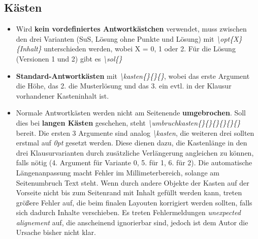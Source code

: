 \documentclass[./main.tex]{subfiles}
\begin{document}
\subsection{Kästen}
\begin{itemize}
    \item Wird \textbf{kein vordefiniertes Antwortk\"astchen} verwendet, muss zwischen den drei Varianten (SuS, L\"osung ohne Punkte und L\"osung) mit \textit{\textbackslash opt\{X\}\{Inhalt\}} unterschieden werden, wobei X = 0, 1 oder 2. F\"ur die L\"osung (Versionen 1 und 2) gibt es \hypertarget{sol}{\textit{\textbackslash sol\{\}}}
    \item \textbf{Standard-Antwortk\"asten} mit \textit{\hypertarget{kasten}{\textbackslash kasten\{\}\{\}\{\}}}, wobei das erste Argument die H\"ohe, das 2. die Musterl\"osung und das 3. ein evtl. in der Klausur vorhandener Kasteninhalt ist.
    \item Normale Antwortk\"asten werden nicht am Seitenende \textbf{umgebrochen}. Soll dies bei \textbf{langen K\"asten} geschehen, steht \hypertarget{umbruchkasten}{\textit{\textbackslash umbruchkasten\{\}\{\}\{\}\{\}\{\}\{\}}} bereit. Die ersten 3 Argumente sind analog \textit{\textbackslash kasten}, die weiteren drei sollten erstmal auf \textit{0pt} gesetzt werden. Diese dienen dazu, die Kastenl\"ange in den drei Klausurvarianten durch zus\"atzliche Verl\"angerung angleichen zu k\"onnen, falls n\"otig (4. Argument f\"ur Variante 0, 5. f\"ur 1, 6. f\"ur 2). Die automatische L\"angenanpassung macht Fehler im Millimeterbereich, solange am Seitenumbruch Text steht. Wenn durch andere Objekte der Kasten auf der Vorseite nicht bis zum Seitenrand mit Inhalt gef\"ullt werden kann, treten gr\"o\ss{}ere Fehler auf, die beim finalen Layouten korrigiert werden sollten, falls sich dadurch Inhalte verschieben. Es treten Fehlermeldungen \textit{unexpected alignement} auf, die anscheinend ignorierbar sind, jedoch ist dem Autor die Ursache bisher nicht klar.
\end{itemize}
\end{document}
